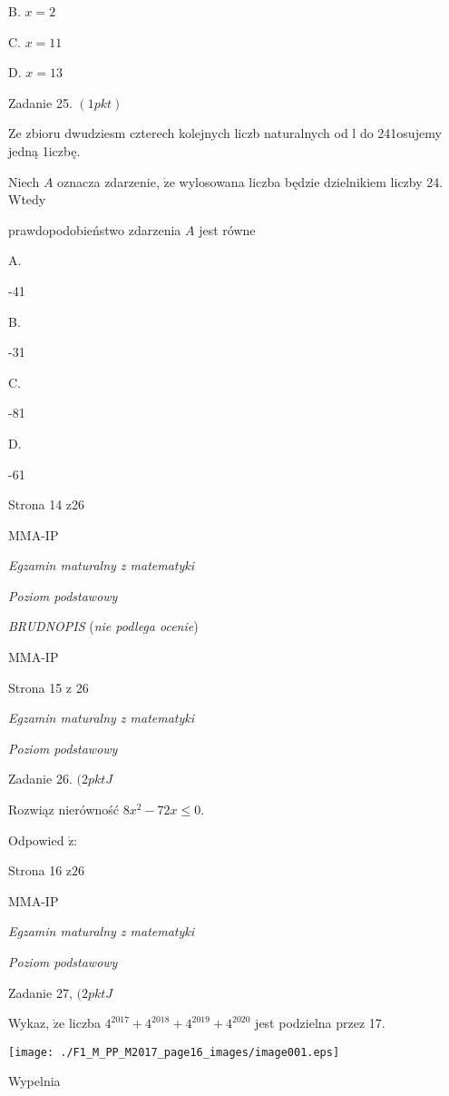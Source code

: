 \documentclass[a4paper,12pt]{article}
\begin{document}
B. $x=2$

C. $x=11$

D. $x=13$

Zadanie 25. $(1pkt)$

Ze zbioru dwudziesm czterech kolejnych liczb naturalnych od l do 241osujemy jedną 1iczbę.

Niech $A$ oznacza zdarzenie, $\dot{\mathrm{z}}\mathrm{e}$ wylosowana liczba będzie dzielnikiem liczby 24. Wtedy

prawdopodobieństwo zdarzenia $A$ jest równe

A.

-41

B.

-31

C.

-81

D.

-61

Strona 14 z26

MMA-IP





{\it Egzamin maturalny z matematyki}

{\it Poziom podstawowy}

{\it BRUDNOPIS} ({\it nie podlega ocenie})

MMA-IP

Strona 15 z 26





{\it Egzamin maturalny z matematyki}

{\it Poziom podstawowy}

Zadanie 26. $(2pktJ$

Rozwiąz nierówność $8x^{2}-72x\leq 0.$

Odpowied $\acute{\mathrm{z}}$:

Strona 16 $\mathrm{z}26$

MMA-IP





{\it Egzamin maturalny z matematyki}

{\it Poziom podstawowy}

Zadanie 27, $(2pktJ$

Wykaz, $\dot{\mathrm{z}}\mathrm{e}$ liczba $4^{2017}+4^{2018}+4^{2019}+4^{2020}$ jest podzielna przez 17.
\begin{center}
\texttt{[image: ./F1\_M\_PP\_M2017\_page16\_images/image001.eps]}
\end{center}
Wypelnia
\end{document}
